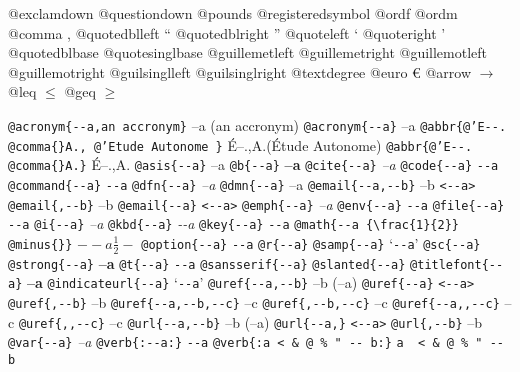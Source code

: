 \documentclass{book}
\begin{document}
@exclamdown \textexclamdown{}
@questiondown \textquestiondown{}
@pounds \textsterling{}
@registeredsymbol \circledR{}
@ordf \textordfeminine{}
@ordm \textordmasculine{}
@comma ,
@quotedblleft \textquotedblleft{}
@quotedblright \textquotedblright{}
@quoteleft \textquoteleft{}
@quoteright \textquoteright{}
@quotedblbase \quotedblbase{}
@quotesinglbase \quotesinglbase{}
@guillemetleft \guillemotleft{}
@guillemetright \guillemotright{}
@guillemotleft \guillemotleft{}
@guillemotright \guillemotright{}
@guilsinglleft \guilsinglleft{}
@guilsinglright \guilsinglright{}
@textdegree \textdegree{}
@euro \euro{}
@arrow $\rightarrow{}$
@leq $\leq{}$
@geq $\geq{}$

\texttt{@acronym\{{-}{-}a,an accronym\}} --a (an accronym)
\texttt{@acronym\{{-}{-}a\}} --a
\texttt{@abbr\{@'E{-}{-}. @comma\{\}A., @'Etude Autonome \}} \'{E}--.\@ ,A.\@ (\'{E}tude Autonome)
\texttt{@abbr\{@'E{-}{-}. @comma\{\}A.\}} \'{E}--.\@ ,A.\@
\texttt{@asis\{{-}{-}a\}} --a
\texttt{@b\{{-}{-}a\}} \textbf{--a}
\texttt{@cite\{{-}{-}a\}} \textit{--a}
\texttt{@code\{{-}{-}a\}} \texttt{{-}{-}a}
\texttt{@command\{{-}{-}a\}} \texttt{{-}{-}a}
\texttt{@dfn\{{-}{-}a\}} \emph{--a}
\texttt{@dmn\{{-}{-}a\}} --a
\texttt{@email\{{-}{-}a,{-}{-}b\}} --b \texttt{<{-}{-}a>}
\texttt{@email\{,{-}{-}b\}} --b
\texttt{@email\{{-}{-}a\}} \texttt{<{-}{-}a>}
\texttt{@emph\{{-}{-}a\}} \emph{--a}
\texttt{@env\{{-}{-}a\}} \texttt{{-}{-}a}
\texttt{@file\{{-}{-}a\}} \texttt{{-}{-}a}
\texttt{@i\{{-}{-}a\}} \textit{--a}
\texttt{@kbd\{{-}{-}a\}} {\ttfamily\textsl{{-}{-}a}}
\texttt{@key\{{-}{-}a\}} \texttt{{-}{-}a}
\texttt{@math\{{-}{-}a \{\textbackslash{}frac\{1\}\{2\}\} @minus\{\}\}} $--a {\frac{1}{2}} -$
\texttt{@option\{{-}{-}a\}} \texttt{{-}{-}a}
\texttt{@r\{{-}{-}a\}} 
\texttt{@samp\{{-}{-}a\}} `\texttt{{-}{-}a}'
\texttt{@sc\{{-}{-}a\}} 
\texttt{@strong\{{-}{-}a\}} \textbf{--a}
\texttt{@t\{{-}{-}a\}} \texttt{{-}{-}a}
\texttt{@sansserif\{{-}{-}a\}} 
\texttt{@slanted\{{-}{-}a\}} 
\texttt{@titlefont\{{-}{-}a\}} {\Huge \bfseries --a}
\texttt{@indicateurl\{{-}{-}a\}} `\texttt{{-}{-}a}'
\texttt{@uref\{{-}{-}a,{-}{-}b\}} --b (--a)
\texttt{@uref\{{-}{-}a\}} \texttt{<{-}{-}a>}
\texttt{@uref\{,{-}{-}b\}} --b
\texttt{@uref\{{-}{-}a,{-}{-}b,{-}{-}c\}} --c
\texttt{@uref\{,{-}{-}b,{-}{-}c\}} --c
\texttt{@uref\{{-}{-}a,,{-}{-}c\}} --c
\texttt{@uref\{,,{-}{-}c\}} --c
\texttt{@url\{{-}{-}a,{-}{-}b\}} --b (--a)
\texttt{@url\{{-}{-}a,\}} \texttt{<{-}{-}a>}
\texttt{@url\{,{-}{-}b\}} --b
\texttt{@var\{{-}{-}a\}} \emph{--a}
\texttt{@verb\{:{-}{-}a:\}} \verb:--a:
\texttt{@verb\{:a  < \& @ \% " {-}{-}    b:\}} \verb:a  < & @ % " --    b:
\end{document}
